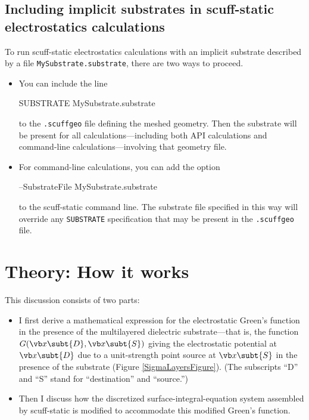 \documentclass[letterpaper]{article}
\begin{document}
\subsection{Including implicit substrates in {\sc scuff-static} electrostatics
            calculations}

To run {\sc scuff-static} electrostatics calculations with an implicit 
substrate described by a file \texttt{MySubstrate.substrate},
there are two ways to proceed.

\begin{itemize}
 \item You can include the line

       \begin{verbcode}
         SUBSTRATE MySubstrate.substrate
       \end{verbcode}

       to the \texttt{.scuffgeo} file defining the meshed geometry.
       Then the substrate will be present for all calculations---including
       both API calculations and command-line calculations---involving 
       that geometry file.
 \item For command-line calculations, you can add the option

       \begin{verbcode}
       --SubstrateFile MySubstrate.substrate
       \end{verbcode}

       to the {\sc scuff-static} command line. 
       The substrate file specified in this way will override
       any \texttt{SUBSTRATE} specification that may be present
       in the \texttt{.scuffgeo} file.
\end{itemize}

\newpage
\section{Theory: How it works}
\label{TheorySection}
This discussion consists of two parts:
\begin{itemize}
 \item
 I first derive a mathematical expression for the electrostatic
 Green's function in the presence of the multilayered dielectric
 substrate---that is, the function $G(\vb x\subt{D},\vb x\subt{S})$
 giving the electrostatic potential at $\vb x\subt{D}$ due to a
 unit-strength point source at $\vb x\subt{S}$ in the 
 presence of the substrate (Figure \ref{SigmaLayersFigure}).
 (The subscripts ``D'' and ``S'' stand for ``destination'' and ``source.'')

 \item
 Then I discuss how the discretized surface-integral-equation
 system assembled by {\sc scuff-static} is modified to accommodate
 this modified Green's function.
\end{itemize}
\end{document}
